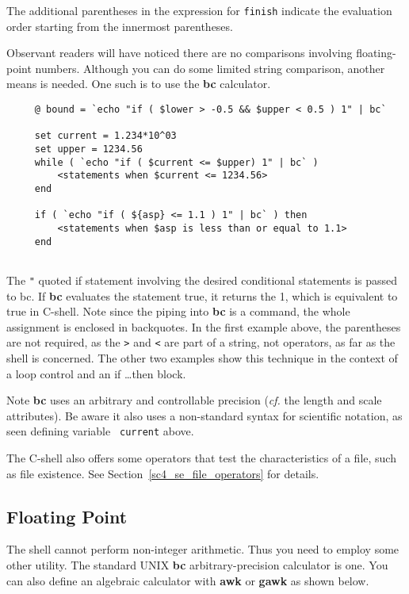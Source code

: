 \documentclass[twoside,11pt]{article}
\newcommand{\htmladdnormallink}[2]{#1}
\newcommand{\htmlref}[2]{#1}
\newcommand{\xref}[3]{#1}
\newcommand{\xlabel}[1]{}
\newcommand{\latexelsehtml}[2]{#1}
\newcommand{\latexelsehtml}[2]{#2}
\begin{document}
The additional parentheses in the expression for {\tt finish} indicate
the evaluation order starting from the innermost parentheses.

Observant readers will have noticed there are no comparisons involving
floating-point numbers.  Although you can do some limited string comparison,
another means is needed.  One such is to use the {\bf bc} calculator.

\small
\begin{verbatim}
     @ bound = `echo "if ( $lower > -0.5 && $upper < 0.5 ) 1" | bc`

     set current = 1.234*10^03
     set upper = 1234.56
     while ( `echo "if ( $current <= $upper) 1" | bc` )
         <statements when $current <= 1234.56>
     end

     if ( `echo "if ( ${asp} <= 1.1 ) 1" | bc` ) then
         <statements when $asp is less than or equal to 1.1>
     end
     
\end{verbatim}
\normalsize

The {\tt{"}} quoted if statement involving the desired conditional
statements is passed to bc.  If {\bf bc} evaluates the statement true,
it returns the 1, which is equivalent to true in C-shell.  Note since
the \htmlref{{\sf piping}}{sc4_gl_pipe} into {\bf bc} is a command,
the whole assignment is enclosed in backquotes.  In the first example
above, the parentheses are not required, as the {\tt >} and {\tt <}
are part of a string, not operators, as far as the shell is concerned.
The other two examples show this technique in the context of a loop
control and an if \ldots then block.

Note {\bf bc} uses an arbitrary and controllable precision (\emph{cf.}
the length and scale attributes).  Be aware it also uses a 
\xref{non-standard syntax for scientific
notation}{sc16}{sc16_writingcsh}, as seen defining variable {\tt
current} above.

The C-shell also offers some operators that test the characteristics
of a file, such as file existence.  See
\latexelsehtml{Section~\ref{sc4_se_file_operators}}{\htmlref{File
Operators}{sc4_se_file_operators}} for details.

\newpage
\subsection{\xlabel{sc4_se_real}Floating Point\label{sc4_se_real}}

The shell cannot perform non-integer arithmetic.  Thus you need to
employ some other utility.  The standard UNIX {\bf bc}
arbitrary-precision calculator is one.  You can also define
an algebraic calculator with \htmladdnormallink{{\bf awk} or
{\bf gawk}}{http://home3.inet.tele.dk/frda/src/calc_tip.html} as shown
below.
\end{document}
